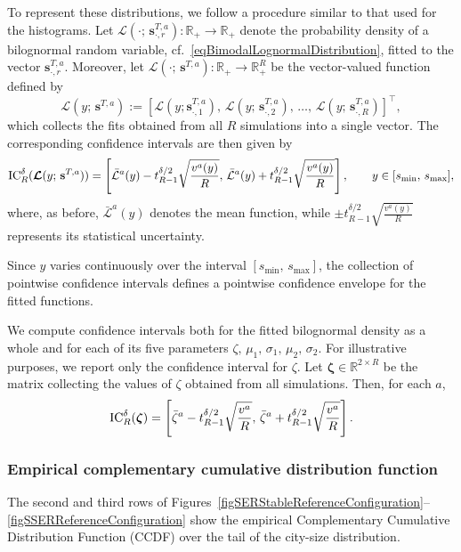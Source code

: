 \documentclass[a4paper]{article}
\newcommand{\R}{\mathbb{R}}
\begin{document}
To represent these distributions, we follow a procedure similar to that used for the histograms. Let $\mathcal{L}(\cdot;\,\mathbf s^{T,a}_{\cdot,r}):\R_+\to\R_+$ denote the probability density of a bilognormal random variable, cf.~\eqref{eqBimodalLognormalDistribution}, fitted to the vector $\mathbf s^{T,a}_{\cdot,r}$. Moreover, let $\boldsymbol{\mathcal{L}}(\cdot;\,\mathbf s^{T,a}):\R_+\to\R_+^R$ be the vector-valued function defined by
$$ \boldsymbol{\mathcal{L}}(y;\,\mathbf s^{T,a}):=
    {\left[\mathcal{L}(y;\mathbf s^{T,a}_{\cdot,1}),\,\mathcal{L}(y;\,\mathbf s^{T,a}_{\cdot,2}),\,\dots,\,\mathcal{L}(y;\,\mathbf s^{T,a}_{\cdot,R})\right]}^\top, $$
which collects the fits obtained from all $R$ simulations into a single vector. The corresponding confidence intervals are then given by
$$ \operatorname{IC}_R^{\delta}(\boldsymbol{\mathcal{L}}(y;\,\mathbf s^{T,a}))=
    \left[\bar{\mathcal L}^a(y)-t^{\delta/2}_{R-1}\sqrt{\frac{v^a(y)}{R}},\,\bar{\mathcal L}^a(y)+t^{\delta/2}_{R-1}\sqrt{\frac{v^a(y)}{R}}\right],
        \qquad y\in [s_{\min},\,s_{\max}], $$
where, as before, $\bar{\mathcal L}^a(y)$ denotes the mean function, while $\pm t^{\delta/2}_{R-1}\sqrt{\frac{v^a(y)}{R}}$ represents its statistical uncertainty.

Since $y$ varies continuously over the interval $[s_{\min},\,s_{\max}]$, the collection of pointwise confidence intervals defines a pointwise confidence envelope for the fitted functions.

\begin{rmk}
We compute confidence intervals both for the fitted bilognormal density as a whole and for each of its five parameters $\zeta,\,\mu_1,\,\sigma_1,\,\mu_2,\,\sigma_2$. For illustrative purposes, we report only the confidence interval for $\zeta$. Let $\boldsymbol{\zeta}\in\R^{2\times R}$ be the matrix collecting the values of $\zeta$ obtained from all simulations. Then, for each $a$,
$$ \operatorname{IC}_R^\delta(\boldsymbol{\zeta})=\left[\bar\zeta^a-t^{\delta/2}_{R-1}\sqrt{\frac{v^a}{R}},\,\bar\zeta^a+t^{\delta/2}_{R-1}\sqrt{\frac{v^a}{R}}\right]. $$
\label{ossBiLognormalParameterFitting}
\end{rmk}

\subsubsection{Empirical complementary cumulative distribution function}
\label{secEmpiricalCCDF}
%
The second and third rows of Figures~\ref{figSERStableReferenceConfiguration}--\ref{figSSERReferenceConfiguration} show the empirical Complementary Cumulative Distribution Function (CCDF) over the tail of the city-size distribution.
\end{document}
